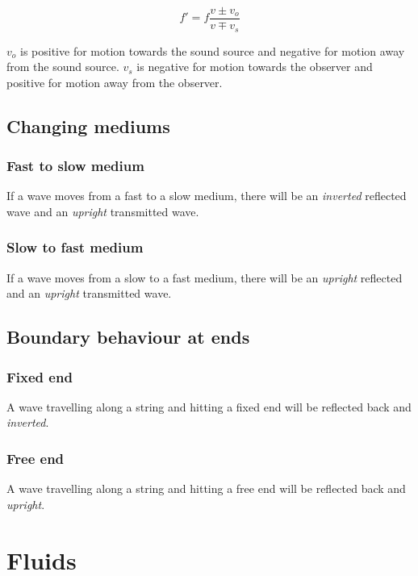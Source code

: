 \documentclass[12pt]{article}
\begin{document}
\[
\boxed{
f' = f \frac{v \pm v_o}{v \mp v_s}
}
\]

$v_o$ is positive for motion towards the sound source and negative for motion away from the sound source.
$v_s$ is negative for motion towards the observer and positive for motion away from the observer.

\subsection{Changing mediums}

\subsubsection{Fast to slow medium}

If a wave moves from a fast to a slow medium, there will be an \emph{inverted} reflected wave and an \emph{upright} transmitted wave.

\subsubsection{Slow to fast medium}

If a wave moves from a slow to a fast medium, there will be an \emph{upright} reflected and an \emph{upright} transmitted wave.

\newpage

\subsection{Boundary behaviour at ends}

\subsubsection{Fixed end}

A wave travelling along a string and hitting a fixed end will be reflected back and \emph{inverted}.

\subsubsection{Free end}

A wave travelling along a string and hitting a free end will be reflected back and \emph{upright}.

\section{Fluids}
\end{document}

